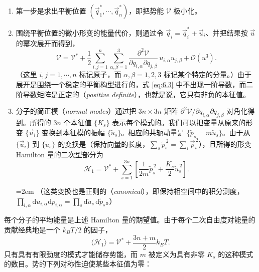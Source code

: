 \begin{enumerate}[label=(\alph*),leftmargin=2.2em,itemsep=0.2em]
\item 第一步是求出平衡位置 $(\vec q_1^*,\cdots,\vec q_n^*)$，即把势能 $\mathcal V$ 极小化。


\item 围绕平衡位置的微小形变的能量代价，则通过令 $\vec q_i=\vec q_i^*+\vec u_i$、并把结果按 $\vec u$ 的幂次展开而得到，
\begin{equation}\label{eq:6.3}
\mathcal V=\mathcal V^*+\frac12\sum_{i,j=1}^n\sum_{\alpha,\beta=1}^3\frac{\partial^2\mathcal V}{\partial q_{i,\alpha}\partial q_{j,\beta}}\,u_{i,\alpha}u_{j,\beta}+\mathcal O(u^3).
\end{equation}
（这里 $i,j=1,\cdots,n$ 标记原子，而 $\alpha,\beta=1,2,3$ 标记某个特定的分量。）由于展开是围绕一个稳定的平衡构型进行的，式 \eqref{eq:6.3} 中不出现一阶导数，而二阶导数矩阵是正定的（\textit{positive definite}），也就是说，它只有非负的本征值。

\item 分子的简正模（\textit{normal modes}）通过把 $3n\times3n$ 矩阵 $\partial^2\mathcal V/\partial q_{i,\alpha}\partial q_{j,\beta}$ 对角化得到。所得的 $3n$ 个本征值 $\{K_s\}$ 表示每个模式的。我们可以把变量从原来的形变 $\{\vec u_i\}$ 变换到本征模的振幅 $\{\tilde u_s\}$。相应的共轭动量是 $\{\tilde p_s=m\dot{\tilde u}_s\}$。由于从 $\{\vec u_i\}$ 到 $\{\tilde u_s\}$ 的变换是（保持向量的长度，$\sum_s\tilde p_s^{\,2}=\sum_i\vec p_i^{\,2}$），且所得的形变 Hamilton 量的二次型部分为
\begin{equation}\label{eq:6.4}
\mathscr H_1=\mathcal V^*+\sum_{s=1}^{3n}\left[\frac1{2m}\tilde p_s^{\,2}+\frac{K_s}{2}\tilde u_s^{\,2}\right].
\end{equation}
{\emergencystretch=2em\relax
（这类变换也是正则的（\textit{canonical}），即保持相空间中的积分测度，$\prod_{i,\alpha}\mathrm du_{i,\alpha}\mathrm dp_{i,\alpha}=\prod_s\mathrm d\tilde u_s\,\mathrm d\tilde p_s$。）\par}
\end{enumerate}

每个分子的平均能量是上述 Hamilton 量的期望值。由于每个二次自由度对能量的贡献经典地是一个 $k_BT/2$ 的因子，
\begin{equation}\label{eq:6.5}
\langle\mathscr H_1\rangle=\mathcal V^*+\frac{3n+m}{2}k_BT.
\end{equation}
只有具有有限劲度的模式才能储存势能，而 $m$ 被定义为具有非零 $K_s$ 的这种模式的数目。势的下列对称性迫使某些本征值为零：


